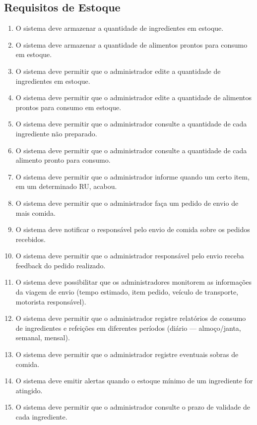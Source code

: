 \documentclass[12pt,a4paper]{article}
\begin{document}
\subsection{Requisitos de Estoque}
\begin{enumerate}[label=\textbf{RF-EST-\arabic*}, leftmargin=*, align=left]
    \item O sistema deve armazenar a quantidade de ingredientes em estoque.
    \item O sistema deve armazenar a quantidade de alimentos prontos para consumo em estoque.
    \item O sistema deve permitir que o administrador edite a quantidade de ingredientes em estoque.
    \item O sistema deve permitir que o administrador edite a quantidade de alimentos prontos para consumo em estoque.
    \item O sistema deve permitir que o administrador consulte a quantidade de cada ingrediente não preparado.
    \item O sistema deve permitir que o administrador consulte a quantidade de cada alimento pronto para consumo.
    \item O sistema deve permitir que o administrador informe quando um certo item, em um determinado RU, acabou.
    \item O sistema deve permitir que o administrador faça um pedido de envio de mais comida.
    \item O sistema deve notificar o responsável pelo envio de comida sobre os pedidos recebidos.
    \item O sistema deve permitir que o administrador responsável pelo envio receba feedback do pedido realizado.
    \item O sistema deve possibilitar que os administradores monitorem as informações da viagem de envio (tempo estimado, item pedido, veículo de transporte, motorista responsável).
    \item O sistema deve permitir que o administrador registre relatórios de consumo de ingredientes e refeições em diferentes períodos (diário — almoço/janta, semanal, mensal).
    \item O sistema deve permitir que o administrador registre eventuais sobras de comida.
    \item O sistema deve emitir alertas quando o estoque mínimo de um ingrediente for atingido.
    \item O sistema deve permitir que o administrador consulte o prazo de validade de cada ingrediente.
\end{enumerate}
\end{document}
